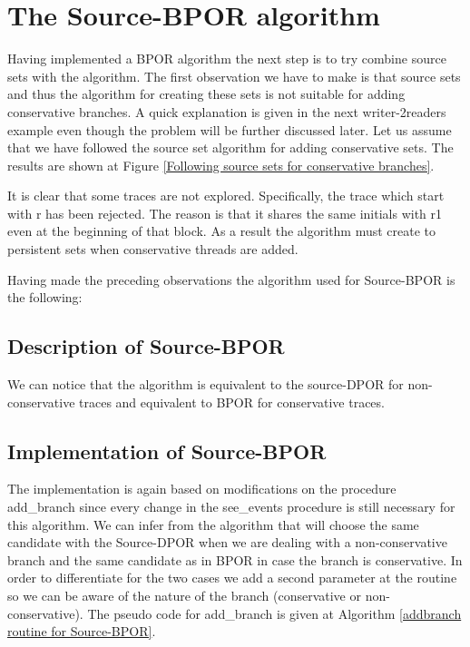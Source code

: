 \section{The Source-BPOR algorithm}
Having implemented a BPOR algorithm the next step is to try combine source sets with the algorithm. The first observation we have to make is that
source sets and thus the algorithm for creating these sets is not suitable for adding conservative branches. A quick explanation is given in the next writer-2readers example
even though the problem will be further discussed later. Let us assume that we have followed the source set algorithm for adding conservative sets. 
The results are shown at Figure \ref{Following source sets for conservative branches}.


It is clear that some traces are not explored. Specifically, the trace which start with r has been rejected. The reason is that it shares the same initials with r1 even at the
beginning of that block. As a result the algorithm must create to persistent sets when conservative threads are added. 

Having made the preceding observations the algorithm used for Source-BPOR is the following:

\subsection{Description of Source-BPOR}

We can notice that the algorithm is equivalent to the source-DPOR for non-conservative traces and equivalent to BPOR for conservative traces.

\subsection{Implementation of Source-BPOR}
The implementation is again based on modifications on the procedure add\_branch since every change in the see\_events procedure is still necessary for this algorithm.
We can infer from the algorithm that will choose the same candidate with the Source-DPOR when we are dealing with a non-conservative branch and the same candidate as in BPOR
in case the branch is conservative. In order to differentiate for the two cases we add a second parameter at the routine so we can be aware of the nature of the
branch (conservative or non-conservative). The pseudo code for add\_branch is given at Algorithm \ref{addbranch routine for Source-BPOR}.

